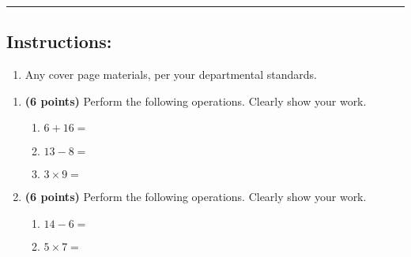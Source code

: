 \documentclass[12pt]{amsart}
\begin{document}
\vspace{.4cm}


\vspace{.4cm}

\hrule

\subsection*{Instructions:} \begin{enumerate}[1.]
\item Any cover page materials, per your departmental standards.
\end{enumerate}


\newpage
\begin{enumerate}
\item {\bf (6 points)} 
 Perform the following operations. Clearly show your work. \begin{enumerate}


\def \a{6}\def \b{16}\def \apb{22}

 
\item $\a + \b = $

\vspace{2cm}
\def \a{13}\def \dif{5}\def \b{8}

 
\item $\a - \b = $

\vspace{2cm}
\def \a{3}\def \b{9}\def \ab{12}

 
\item $\a \times \b = $ 

\vspace{2cm}
\def \vshift{-3}\def \hshift{2}\def \chang{0}\def \findval{2}\def \yval{-3}

 
\end{enumerate}


\newpage
\item {\bf (6 points)} 
 Perform the following operations. Clearly show your work. \begin{enumerate}


\def \a{14}\def \dif{8}\def \b{6}

 
\item $\a - \b = $

\vspace{2cm}
\def \a{5}\def \b{7}\def \ab{12}

 
\item $\a \times \b = $ 

\vspace{2cm}
\def \vshift{1}\def \hshift{2}\def \chang{2}\def \findval{4}\def \yval{-3}

 
\end{enumerate}


\newpage\end{enumerate}\graphicspath{{C:/Users/iainc/anaconda3/Randomizer/Sample Course/Sample Assessment 2/}}\setcounter{page}{1}
\end{document}
